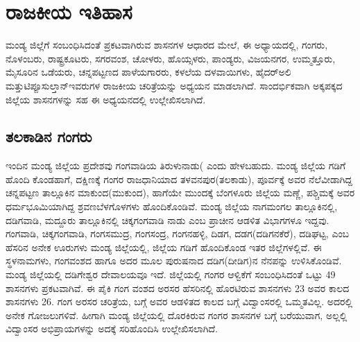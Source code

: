 
\chapter{ರಾಜಕೀಯ ಇತಿಹಾಸ}

ಮಂಡ್ಯ ಜಿಲ್ಲೆಗೆ ಸಂಬಂಧಿಸಿದಂತೆ ಪ್ರಕಟವಾಗಿರುವ ಶಾಸನಗಳ ಆಧಾರದ ಮೇಲೆ, ಈ ಅಧ್ಯಾಯದಲ್ಲಿ, ಗಂಗರು, ನೊಳಂಬರು, ರಾಷ್ಟ್ರಕೂಟರು, ಸಗರವಂಶ, ಚೋಳರು, ಹೊಯ್ಸಳರು, ಪಾಂಡ್ಯರು, ವಿಜಯನಗರ, ಉಮ್ಮತ್ತೂರು, ಮೈಸೂರಿನ ಒಡೆಯರು, ಚನ್ನಪಟ್ಟಣದ ಪಾಳೆಯಗಾರರು, ಕಳಲೆಯ ದಳವಾಯಿಗಳು, ಹೈದರ್​ಅಲಿ ಮತ್ತು\break ಟಿಪ್ಪೂಸುಲ್ತಾನ್​ ಇವರುಗಳ ರಾಜಕೀಯ ಚರಿತ್ರೆಯನ್ನು ಅಧ್ಯಯನ ಮಾಡಲಾಗಿದೆ. ಸಾಂದರ್ಭಿಕವಾಗಿ ಅಕ್ಕಪಕ್ಕದ ಜಿಲ್ಲೆಯ ಶಾಸನಗಳನ್ನು ಸಹ ಈ ಅಧ್ಯಯನದಲ್ಲಿ ಉಲ್ಲೇಖಿಸಲಾಗಿದೆ.

\section{ತಲಕಾಡಿನ ಗಂಗರು}

ಇಂದಿನ ಮಂಡ್ಯ ಜಿಲ್ಲೆಯ ಪ್ರದೇಶವು ಗಂಗವಾಡಿಯ ತಿರುಳುನಾಡು( ಎಂದು ಹೇಳಬಹುದು. ಮಂಡ್ಯ ಜಿಲ್ಲೆಯ ಗಡಿಗೆ ಹೊಂದಿ ಕೊಂಡಹಾಗೆ, ದಕ್ಷಿಣಕ್ಕೆ ಗಂಗರ ರಾಜಧಾನಿಯಾದ ತಳವನಪುರ(ತಲಕಾಡು), ಪೂರ್ವಕ್ಕೆ ಅವರ ನೆಲೆವೀಡಾಗಿದ್ದ ಚನ್ನಪಟ್ಟಣ ತಾಲ್ಲೂಕಿನ ಮಾಕುಂದ(ಮುಕುಂದ), ಹಾಗೆಯೇ ಮುಂದಕ್ಕೆ ಬೆಂಗಳೂರು ಜಿಲ್ಲೆಯ ಮಣ್ಣೆ, ಪಶ್ಚಿಮಕ್ಕೆ ಅವರ ಧರ್ಮಭೂಮಿಯಾಗಿದ್ದ ಶ್ರವಣಬೆಳಗೊಳಗಳು ಹೊಂದಿಕೊಂಡಿವೆ. ಮಂಡ್ಯ ಜಿಲ್ಲೆಯ ನಾಗಮಂಗಲ ತಾಲ್ಲೂಕಿನಲ್ಲಿ, ದಡಿಗವಾಡಿ, ಮದ್ದೂರು ತಾಲ್ಲೂಕಿನಲ್ಲಿ ಚಿಕ್ಕಗಂಗವಾಡಿ ನಾಡು ಎಂಬ ಪ್ರಾಚೀನ ಆಡಳಿತ ವಿಭಾಗಗಳೂ ಇದ್ದವು. ಗಂಗವಾಡಿ, ಚಿಕ್ಕಗಂಗವಾಡಿ, ಗಂಗಸಮುದ್ರ, ಗಂಗಸಂದ್ರ, ಗಂಗನಹಳ್ಳಿ, ದಿಡಗ, ದಡಗ(ದಡಿಗನಕೆರೆ), ದಡಿಘಟ್ಟ, ಎಂಬ ಹೆಸರಿನ ಅನೇಕ ಊರುಗಳು ಮಂಡ್ಯ ಜಿಲ್ಲೆಯಲ್ಲಿ, ಜಿಲ್ಲೆಯ ಗಡಿಗೆ ಹೊಂದಿಕೊಂಡ ಇತರ ಜಿಲ್ಲೆಗಳಲ್ಲಿವೆ. ಈ ಸ್ಥಳನಾಮಗಳು, ಗಂಗವಂಶದ ಹಾಗೂ ಅದರ ಮೂಲ ಪುರುಷನಾದ ದಡಿಗ(ದೀಡಿಗ)ನ ನೆನಪನ್ನು ಉಳಿಸಿಕೊಂಡಿವೆ. ಮಂಡ್ಯ ಜಿಲ್ಲೆಯಲ್ಲಿ ದಡಿಗೇಶ್ವರ ದೇವಾಲಯವೂ ಇದೆ. ಜಿಲ್ಲೆಯಲ್ಲಿ ಗಂಗರ ಆಳ್ವಿಕೆಗೆ ಸಂಬಂಧಿಸಿದಂತೆ ಒಟ್ಟು 49 ಶಾಸನಗಳು ಪ್ರಕಟವಾಗಿವೆ. ಈ ಪೈಕಿ ಗಂಗ ವಂಶದ ಅರಸರ ಹೆಸರಿನಲ್ಲಿ ಹೊರಟಿರುವ ಶಾಸನಗಳು 23 ಅವರ ಕಾಲದ ಶಾಸನಗಳು 26. ಗಂಗ ಅರಸರ ಚರಿತ್ರೆಯ, ಬಗ್ಗೆ ಅವರ ಆಡಳಿತದ ಕಾಲದ ಬಗ್ಗೆ ವಿದ್ವಾಂಸರಲ್ಲಿ ಒಮ್ಮತವಿಲ್ಲ. ಅದರಲ್ಲಿ ಅನೇಕ ಗೋಜಲುಗಳಿವೆ. ಹೀಗಾಗಿ ಮಂಡ್ಯ ಜಿಲ್ಲೆಯಲ್ಲಿ ದೊರಕಿರುವ ಗಂಗರ ಶಾಸನಗಳ ಬಗ್ಗೆ ಬರೆಯುವಾಗ, ಅಲ್ಲಲ್ಲಿ ವಿದ್ವಾಂಸರ ಅಭಿಪ್ರಾಯಗಳನ್ನು ಅದಕ್ಕೆ ಸರಿಹೊಂದಿಸಿ ಉಲ್ಲೇಖಿಸಲಾಗಿದೆ.

